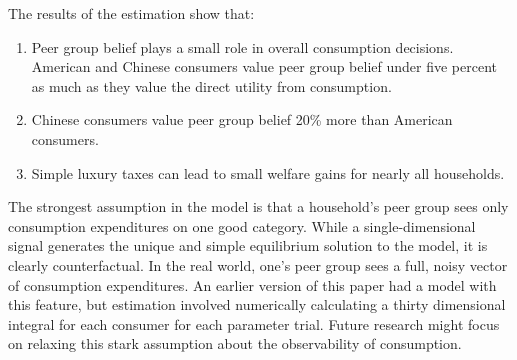 The results of the estimation show that:
\begin{enumerate}
    \item Peer group belief plays a small role in overall consumption decisions.  American and Chinese consumers value peer group belief under five percent as much as they value the direct utility from consumption.
    \item Chinese consumers value peer group belief 20\% more than American consumers.
    \item Simple luxury taxes can lead to small welfare gains for nearly all households.
\end{enumerate}

The strongest assumption in the model is that a household's peer group sees only consumption expenditures on one good category.  While a single-dimensional signal generates the unique and simple equilibrium solution to the model, it is clearly counterfactual.  In the real world, one's peer group sees a full, noisy vector of consumption expenditures.  An earlier version of this paper had a model with this feature, but estimation involved numerically calculating a thirty dimensional integral for each consumer for each parameter trial.  Future research might focus on relaxing this stark assumption about the observability of consumption.

% 
% 
% 
% 


